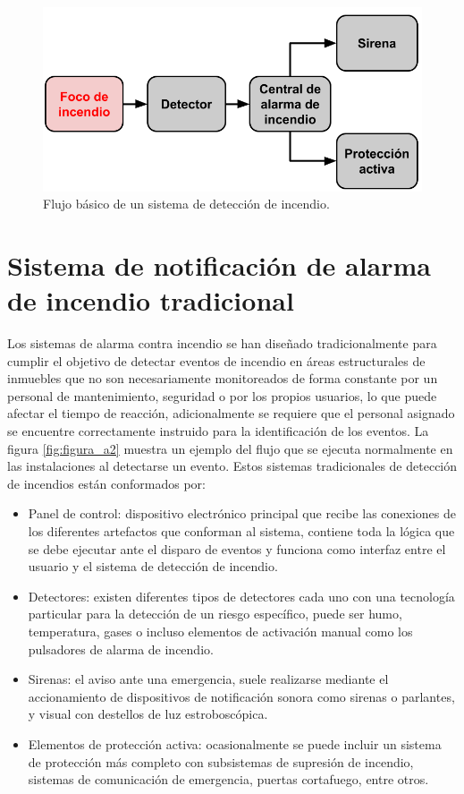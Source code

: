 \begin{figure}[h]
	\centering
	\includegraphics[scale=.4]{./Figures/Capitulo1/FIG_A1.png}
	\caption{Flujo básico de un sistema de detección de incendio.}
	\label{fig:figura_a1}
\end{figure}



\section{Sistema de notificación de alarma de incendio tradicional}

Los sistemas de alarma contra incendio se han diseñado tradicionalmente para cumplir el objetivo de detectar eventos de incendio en áreas estructurales de inmuebles que no son necesariamente monitoreados de forma constante por un personal de mantenimiento, seguridad o por los propios usuarios, lo que puede afectar el tiempo de reacción, adicionalmente se requiere que el personal asignado se encuentre correctamente instruido para la identificación de los eventos. La figura \ref{fig:figura_a2} muestra un ejemplo del flujo que se ejecuta normalmente en las instalaciones al detectarse un evento.
Estos sistemas tradicionales de detección de incendios están conformados por:

\begin{itemize}
\item Panel de control: dispositivo electrónico principal que recibe las conexiones de los diferentes artefactos que conforman al sistema, contiene toda la lógica que se debe ejecutar ante el disparo de eventos y funciona como interfaz entre el usuario y el sistema de detección de incendio.
\item Detectores: existen diferentes tipos de detectores cada uno con una tecnología particular para la detección de un riesgo específico, puede ser humo, temperatura, gases  o incluso elementos de activación manual como los pulsadores de alarma de incendio.
\item Sirenas: el aviso ante una emergencia, suele realizarse mediante el accionamiento de dispositivos de notificación sonora como sirenas o parlantes, y visual con destellos de luz estroboscópica.
\item Elementos de protección activa: ocasionalmente se puede incluir un sistema de protección más completo con subsistemas de supresión de incendio, sistemas de comunicación de emergencia, puertas cortafuego, entre otros.
\end{itemize}

